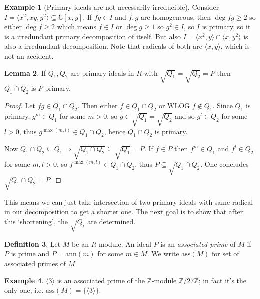 \documentclass[a4paper]{article}
\newcommand{\la}{\langle}
\newcommand{\ra}{\rangle}
\newcommand{\Z}{\mathbb Z}
\newcommand{\C}{\mathbb C}
\newcommand{\ass}{\text{ass}}
\newcommand{\ann}{\text{ann}}
\theoremstyle{definition}
\newtheorem{defn}{Definition}[subsection]
\newtheorem{lemma}[defn]{Lemma}
\newtheorem{example}[defn]{Example}
\begin{document}
\begin{example}[Primary ideals are not necessarily irreducible]
Consider $I=\la x^2,xy,y^2\ra\subseteq \C[x,y]$. If $fg\in I$ and $f,g$ are homogeneous, then $\deg fg\geq 2$ so either $\deg f\geq 2$ which means $f\in I$ or $\deg g\geq 1$ so $g^2\in I$, so $I$ is primary, so it is a irredundant primary decomposition of itself. But also $I=\la x^2,y\ra\cap\la x,y^2\ra$ is also a irredundant decomposition. Note that radicals of both are $\la x,y\ra$, which is not an accident.
\end{example}

\begin{lemma}
If $Q_1,Q_2$ are primary ideals in $R$ with $\sqrt{Q_1}=\sqrt{Q_2}=P$ then $Q_1\cap Q_2$ is $P$-primary.
\end{lemma}
\begin{proof}
Let $fg\in Q_1\cap Q_2$. Then either $f\in Q_1\cap Q_2$ or WLOG $f\notin Q_1$. Since $Q_1$ is primary, $g^m\in Q_1$ for some $m>0$, so $g\in\sqrt{Q_1}=\sqrt{Q_2}$ and so $g^l\in Q_2$ for some $l>0$, thus $g^{\max(m,l)}\in Q_1\cap Q_2$, hence $Q_1\cap Q_2$ is primary.

Now $Q_1\cap Q_2\subseteq Q_1\Rightarrow \sqrt{Q_1\cap Q_2}\subseteq \sqrt{Q_1}=P$. If $f\in P$ then $f^m\in Q_1$ and $f^l\in Q_2$ for some $m,l>0$, so $f^{\max(m,l)}\in Q_1\cap Q_2$, thus $P\subseteq\sqrt{Q_1\cap Q_2}$. One concludes $\sqrt{Q_1\cap Q_2}=P$. 
\end{proof}
This means we can just take intersection of two primary ideals with same radical in our decomposition to get a shorter one. The next goal is to show that after this `shortening', the $\sqrt{Q_i}$ are determined.

\begin{defn}
Let $M$ be an $R$-module. An ideal $P$ is an \textit{associated prime} of $M$ if $P$ is prime and $P=\ann(m)$ for some $m\in M$. We write $\ass(M)$ for set of associated primes of $M$.
\end{defn}
\begin{example}
$\la 3\ra$ is an associated prime of the $\Z$-module $\Z/27\Z$; in fact it's the only one, i.e. $\ass(M)=\{\la3\ra\}$.
\end{example}
\end{document}
